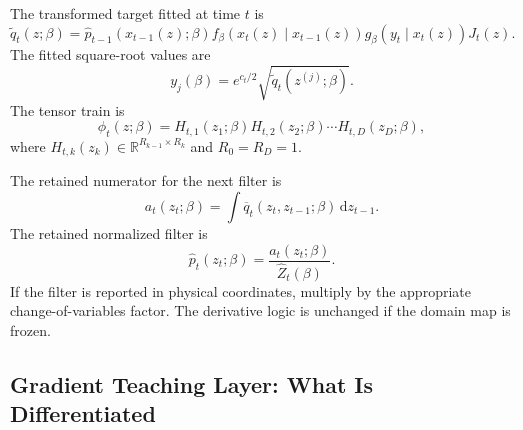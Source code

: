\documentclass[11pt]{article}
\numberwithin{equation}{section}
\newcommand{\R}{\mathbb R}
\newcommand{\dd}{\,\mathrm d}
\begin{document}
The transformed target fitted at time \(t\) is
\begin{equation}
    \widetilde q_t(z;\beta)
    =
    \widehat p_{t-1}(x_{t-1}(z);\beta)
    f_\beta(x_t(z)\mid x_{t-1}(z))
    g_\beta(y_t\mid x_t(z))
    J_t(z).
    \label{eq:p24-p19-46}
\end{equation}
The fitted square-root values are
\begin{equation}
    y_j(\beta)
    =
    e^{c_t/2}\sqrt{\widetilde q_t(z^{(j)};\beta)}.
    \label{eq:p24-p19-47}
\end{equation}
The tensor train is
\begin{equation}
    \phi_t(z;\beta)
    =
    H_{t,1}(z_1;\beta)H_{t,2}(z_2;\beta)\cdots H_{t,D}(z_D;\beta),
    \label{eq:p24-p19-48}
\end{equation}
where \(H_{t,k}(z_k)\in\R^{R_{k-1}\times R_k}\) and \(R_0=R_D=1\).

The retained numerator for the next filter is
\begin{equation}
    a_t(z_t;\beta)
    =
    \int \overline q_t(z_t,z_{t-1};\beta)\dd z_{t-1}.
    \label{eq:p24-p19-49}
\end{equation}
The retained normalized filter is
\begin{equation}
    \widehat p_t(z_t;\beta)
    =
    \frac{a_t(z_t;\beta)}{\widehat Z_t(\beta)}.
    \label{eq:p24-p19-50}
\end{equation}
If the filter is reported in physical coordinates, multiply by the appropriate
change-of-variables factor.  The derivative logic is unchanged if the domain
map is frozen.

\subsection{Gradient Teaching Layer: What Is Differentiated}
\end{document}
